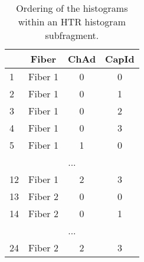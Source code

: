 \begin{table}[htb]
\caption{Ordering of the histograms within an HTR histogram subfragment.}\label{tab:htr_horder}
\begin{center}
\begin{tabular}{lccc}
\hline
  & Fiber   & ChAd & CapId \\ \hline
1 & Fiber 1 & 0    & 0 \\
2 & Fiber 1 & 0    & 1 \\
3 & Fiber 1 & 0    & 2 \\
4 & Fiber 1 & 0    & 3 \\
5 & Fiber 1 & 1    & 0 \\
\multicolumn{4}{c}{...} \\
12 & Fiber 1 & 2   & 3 \\
13 & Fiber 2 & 0   & 0 \\
14 & Fiber 2 & 0   & 1 \\
\multicolumn{4}{c}{...} \\
24 & Fiber 2 & 2   & 3 \\
\hline
\end{tabular}
\end{center}
\end{table}


